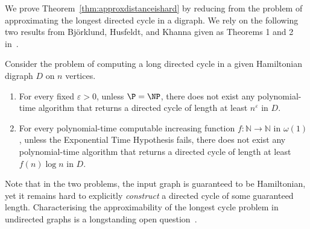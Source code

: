 \documentclass[runningheads]{llncs}
\begin{document}
We prove Theorem~\ref{thm:approxdistanceishard} by reducing from the problem of approximating the longest directed cycle in a digraph. We rely on the following two results from Bj\"{o}rklund, Husfeldt, and Khanna given as Theorems 1 and 2 in~\cite{BHK04}. 

\begin{theorem}\label{thm:longcycle}
  Consider the problem of computing a long directed cycle in a given Hamiltonian digraph $D$ on $n$ vertices.
  \begin{enumerate}
  \item For every fixed $\varepsilon>0$, unless $\P=\NP$, there does not exist any polynomial-time algorithm that returns a directed cycle of length at least $n^{\varepsilon}$ in $D$.
  \item For every polynomial-time computable increasing function $f:\mathbb{N}\to \mathbb{N}$ in $\omega(1)$, unless the Exponential Time Hypothesis fails, there does not exist any
    polynomial-time algorithm that returns a directed cycle of length at least $f(n) \log n$ in $D$.
    \end{enumerate}
\end{theorem}

Note that in the two problems, the input graph is guaranteed to be Hamiltonian, yet it remains hard to explicitly \emph{construct} a directed cycle of some guaranteed length. Characterising the approximability of the longest cycle problem in undirected graphs is a longstanding open question~\cite{AYZ95,GN08}. 



\end{document}
